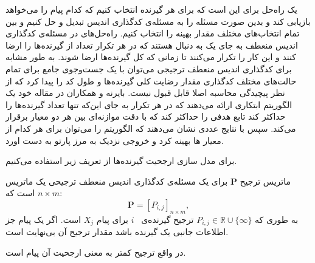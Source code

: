  یک راه‌حل 
 برای 
 \picod
  این است که برای هر گیرنده انتخاب کنیم که کدام پیام را می‌خواهد بازیابی کند و بدین صورت مسئله را به مسئله‌ی کدگذاری اندیس تبدیل و حل کنیم و بین تمام انتخاب‌های مختلف مقدار بهینه را انتخاب کنیم.  راه‌حل‌های
 در مسئله‌ی کدگذاری اندیس منعطف به جای یک 
به دنبال 
هستند که در هر تکرار تعداد
از گیرنده‌ها را ارضا کنند و این کار را تکرار می‌کنند تا زمانی که کل گیرنده‌ها ارضا شوند. به طور مشابه برای کدگذاری اندیس منعطف ترجیجی می‌توان با یک جست‌وجوی جامع برای تمام حالت‌های مختلف کدگذاری مقدار رضایت کلی گیرنده‌ها و طول کد را پیدا کرد که از نظر پیچیدگی محاسبه اصلا قابل قبول نیست. بایرنه و همکاران در مقاله خود یک الگوریتم ابتکاری ارائه می‌دهند که در هر تکرار به جای این‌که تنها تعداد گیرنده‌ها را حداکثر کند تابع هدفی را حداکثر کند که با دقت موازنه‌ای بین هر دو معیار برقرار می‌کند. سپس با نتایج عددی نشان می‌دهند که الگوریتم را می‌توان برای هر کدام از معیار ها بهینه کرد و خروجی نزدیک به مرز پارتو به دست اورد.

برای مدل سازی ارجحیت گیرنده‌ها از تعریف زیر استفاده می‌کنیم.
\begin{definition}
	ماتریس ترجیح
	$\boldsymbol{P}$ 
	برای یک مسئله‌ی کدگذاری اندیس منعطف ترجیحی یک ماتریس
	 $n\times m$
	 است که:
	\begin{equation}
		\boldsymbol{P} = [P_{i,j}]_{n\times m},
	\end{equation}
	به طوری که
	 $P_{i,j}\in\mathbb{R}\cup\{\infty\}$ 
	 ترجیح گیرنده‌ی
	 ~$i$
	 برای پیام
	  $X_j$
	  است.
	اگر یک پیام جز اطلاعات جانبی یک گیرنده باشد مقدار ترجیح آن بی‌نهایت است.
	
	در واقع ترجیح کمتر به معنی ارجحیت آن پیام است.
\end{definition}

